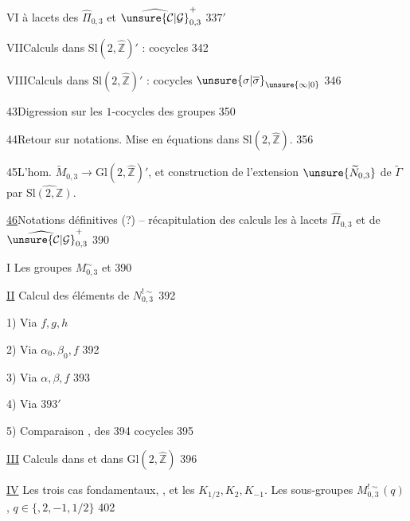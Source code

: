 VI\quad {} à lacets des $\widehat{\Pi}_{0,3}$ et
$\widehat{\unsure{\mathcal C|\mathcal G}}_{0,3}^{+}$
\hfill $337'$

VII\quad Calculs dans $\mathrm{Sl}(2,\widehat{\mathbb Z})'$ :
cocycles 
\hfill 342

VIII\quad Calculs dans $\mathrm{Sl}(2,\widehat{\mathbb Z})'$ :
cocycles  $\unsure{\sigma|\overline{\sigma}}_{\unsure{\infty|0}}$
\hfill 346


43\quad Digression sur les $1$-cocycles des groupes 
\hfill 350

44\quad Retour sur notations.
Mise en équations dans $\mathrm{Sl}(2,\widehat{\mathbb Z})$.
\hfill 356

45\quad L'hom.
$\widetilde{M}_{0,3}\longrightarrow \mathrm{Gl}(2,\widehat{\mathbb Z})'$,
et construction de l'extension $\unsure{\widetilde{N}_{0,3}}$
de $\widetilde{\Gamma}$ par $\widehat{\mathrm{Sl}(2,\mathbb Z)}$.
\hfill {}

\uline{46}\quad Notations définitives (?) -- récapitulation
des calculs  les  à lacets
 $\widehat{\Pi}_{0,3}$ et de
$\widehat{\unsure{\mathcal C|\mathcal G}}_{0,3}^{+}$
\hfill 390



I Les groupes \(M_{0,3}^{\sim}\) et  \hfill 390

\uline{II} Calcul des éléments de \(N_{0,3}^{!\sim}\) \hfill 392

1) Via \(f,g,h\)

2) Via \(\alpha_0,\beta_0,f\) \hfill 392

3) Via \(\alpha,\beta,f\) \hfill 393

4) Via  \hfill \(393'\)

5) Comparaison  ,  des \hfill 394
cocycles \hfill 395

\uline{III} Calculs dans  et dans \(\mathrm{Gl}(2,\widehat{\mathbb Z})\) \hfill 396

\uline{IV} Les trois cas fondamentaux, 
, et les 
\(K_{1/2},K_2,K_{-1}\). Les sous-groupes \(M_{0,3}^{!\sim}(q)\),
\(q\in\{\)\(,2,-1,1/2\}\)
\hfill {} 402


